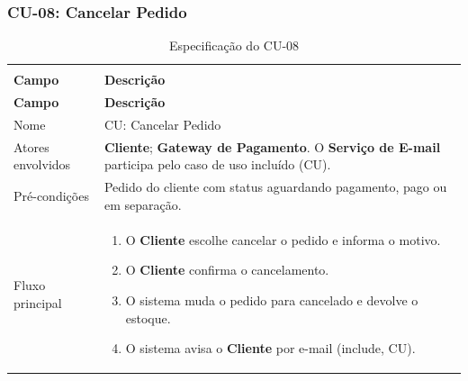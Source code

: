 \documentclass[12pt,a4paper]{article}
\begin{document}
\Needspace{200pt}
\subsubsection{CU-08: Cancelar Pedido}

{\setlength{\arrayrulewidth}{0.3pt}\renewcommand{\arraystretch}{1.1}\small{}
\begin{xltabular}{\textwidth}{>{\raggedright\arraybackslash}p{3.4cm}|>{\raggedright\arraybackslash}X}
\caption{Especificação do CU-08}\\
\toprule{}
\textbf{Campo} & \textbf{Descrição}\\ \midrule{}
\endfirsthead
{}\toprule{}
\textbf{Campo} & \textbf{Descrição}\\ \midrule{}
\endhead
\endlastfoot
Nome & CU: Cancelar Pedido\\ \hline
Atores envolvidos & \textbf{Cliente}; \textbf{Gateway de Pagamento}. O \textbf{Serviço de E-mail} participa pelo caso de uso incluído (CU).\\ \hline
Pré-condições & Pedido do cliente com status aguardando pagamento, pago ou em separação.\\ \hline
Fluxo principal & \begin{enumerate}[nosep,leftmargin=1.4em,label=\arabic*.,before=\vspace{-\baselineskip},after=\vspace{-0.4\baselineskip}]\item O \textbf{Cliente} escolhe cancelar o pedido e informa o motivo. \item O \textbf{Cliente} confirma o cancelamento. \item O sistema muda o pedido para cancelado e devolve o estoque. \item O sistema avisa o \textbf{Cliente} por e-mail (include, CU). \end{enumerate}\\ \hline

\end{xltabular}}
\end{document}
